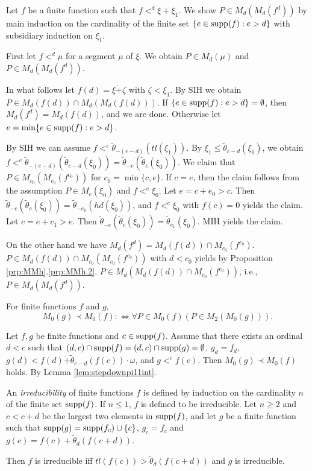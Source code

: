 \documentclass{article}
\begin{document}
Let $f$ be a finite function such that 
$f<^{d}\xi+\xi_{1}$.
We show $P\in M_{d}(M_{d}(f^{d}))$ by main induction on 
the cardinality of the finite set $\{e\in {\rm supp}(f): e>d\}$
 with subsidiary induction on $\xi_{1}$.

First let $f<^{d}\mu$ for a segment $\mu$ of $\xi$. We obtain
$P\in M_{d}(\mu)$ and $P\in M_{d}(M_{d}(f^{d}))$.

In what follows let $f(d)=\xi\dot{+}\zeta$ with $\zeta<\xi_{1}$.
By SIH we obtain $P\in M_{d}(f(d))\cap M_{d}(M_{d}(f(d)))$.
If $\{e\in {\rm supp}(f): e>d\}=\emptyset$, then $M_{d}(f^{d})=M_{d}(f(d))$, and we are done.
Otherwise let $e=\min\{e\in {\rm supp}(f): e>d\}$.

By SIH we can assume $f<^{e}\tilde{\theta}_{-(e-d)}(tl(\xi_{1}))$.
By $\xi_{1}\leq\tilde{\theta}_{c-d}(\xi_{0})$, 
we obtain $f<^{e}\tilde{\theta}_{-(e-d)}(\tilde{\theta}_{c-d}(\xi_{0}))=\tilde{\theta}_{-e}(\tilde{\theta}_{c}(\xi_{0}))$.
We claim that $P\in M_{c_{0}}(M_{c_{0}}(f^{c_{0}}))$ for $c_{0}=\min\{c,e\}$.
If $c=e$, then the claim follows from the assumption $P\in M_{c}(\xi_{0})$ and $f<^{e}\xi_{0}$.
Let $e=c+e_{0}>c$. Then $\tilde{\theta}_{-e}(\tilde{\theta}_{c}(\xi_{0}))=\tilde{\theta}_{-e_{0}}(hd(\xi_{0}))$, and
$f<^{c}\xi_{0}$ with $f(c)=0$ yields the claim.
Let $c=e+c_{1}>e$. Then $\tilde{\theta}_{-e}(\tilde{\theta}_{c}(\xi_{0}))=\tilde{\theta}_{c_{1}}(\xi_{0})$.
MIH yields the claim.

On the other hand we have
$M_{d}(f^{d})=M_{d}(f(d))\cap M_{c_{0}}(f^{c_{0}})$.
$P\in M_{d}(f(d))\cap M_{c_{0}}(M_{c_{0}}(f^{c_{0}}))$ with $d<c_{0}$ yields by 
Proposition \ref{prp:MMh}.\ref{prp:MMh.2},
$P\in M_{d}\left(M_{d}(f(d))\cap M_{c_{0}}(f^{c_{0}})\right)$, i.e.,
$P\in M_{d}(M_{d}(f^{d}))$.
\eprf


For finite functions $f$ and $g$,
\[
 M_{0}(g)\prec M_{0}(f)
 :\Leftrightarrow 
\forall P\in M_{0}(f)
\left(
P\in M_{2}(M_{0}(g))
\right)
.
\]


\bcor\label{cor:stepdownpi11int}
Let $f,g$ be finite functions and $c\in{\rm supp}(f)$.
Assume  that 
there exists an ordinal
$d<c$ 
such that
$(d,c)\cap {\rm supp}(f)=(d,c)\cap {\rm supp}(g)=\emptyset$, 
$g_{d}=f_{d}$, 
$g(d)<f(d)\dot{+}\tilde{\theta}_{c-d}(f(c))\cdot\omega$,
and
$g<^{c}f(c)$.
Then
$M_{0}(g)\prec M_{0}(f)$ holds.
\ecor
\bprf
By Lemma \ref{lem:stepdownpi11int}.
\eprf



\bdf\label{df:irreducible}
{\rm
An \textit{irreducibility} of finite functions $f$
 is defined by induction on the cardinality
$n$ of the finite set ${\rm supp}(f)$.
If $n\leq 1$, $f$ is defined to be irreducible.
Let $n\geq 2$ and $c<c+d$ be the largest two elements in ${\rm supp}(f)$, and let $g$ be 
a finite function
such that ${\rm supp}(g)={\rm supp}(f_{c})\cup\{c\}$, $g_{c}=f_{c}$ and
$g(c)=f(c)+\tilde{\theta}_{d}(f(c+d))$.

Then $f$ is irreducible iff 
$tl(f(c))>\tilde{\theta}_{d}(f(c+d))$ and
$g$ is irreducible.

}
\edf
\end{document}
